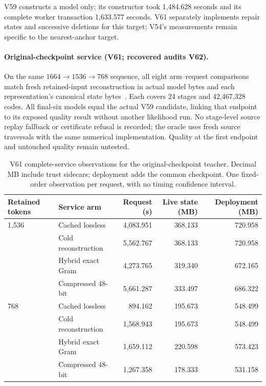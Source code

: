 \documentclass[10pt,twocolumn,letterpaper]{article}
\begin{document}
V59 constructs a model only; its constructor took 1,484.628 seconds and its
complete worker transaction 1,633.577 seconds. V61 separately implements repair
states and successive deletions for this target; V54's measurements remain
specific to the nearest-anchor target.

\paragraph{Original-checkpoint service (V61; recovered audits V62).}
On the same $1664\to1536\to768$ sequence, all eight arm--request comparisons
match fresh retained-input reconstruction in actual model bytes and each
representation's canonical state bytes~\cite{v62terminal}. Each covers 24 stages
and 42,467,328 codes. All final-six models equal the actual V59 candidate, linking
that endpoint to its exposed quality result without another likelihood run.
No stage-level source replay fallback or certificate refusal is recorded; the
oracle uses fresh source traversals with the same numerical implementation.
Quality at the first endpoint and untouched quality remain untested.

\begin{table}[t]
\centering\small
\begin{tabular}{llrrr}
\toprule
Retained tokens & Service arm & Request (s) & Live state (MB) & Deployment (MB) \\
\midrule
1,536 & Cached lossless & 4,083.951 & 368.133 & 720.958 \\
  & Cold reconstruction & 5,562.767 & 368.133 & 720.958 \\
  & Hybrid exact Gram & 4,273.765 & 319.340 & 672.165 \\
  & Compressed 48-bit & 5,661.287 & 333.497 & 686.322 \\
\midrule
768 & Cached lossless & 894.162 & 195.673 & 548.499 \\
  & Cold reconstruction & 1,568.943 & 195.673 & 548.499 \\
  & Hybrid exact Gram & 1,659.112 & 220.598 & 573.423 \\
  & Compressed 48-bit & 1,267.358 & 178.333 & 531.158 \\
\bottomrule
\end{tabular}
\caption{V61 complete-service observations for the original-checkpoint teacher.
Decimal MB include trust sidecars; deployment adds the common checkpoint.
One fixed-order observation per request, with no timing confidence interval.}
\label{tab:v61}
\end{table}
\end{document}
